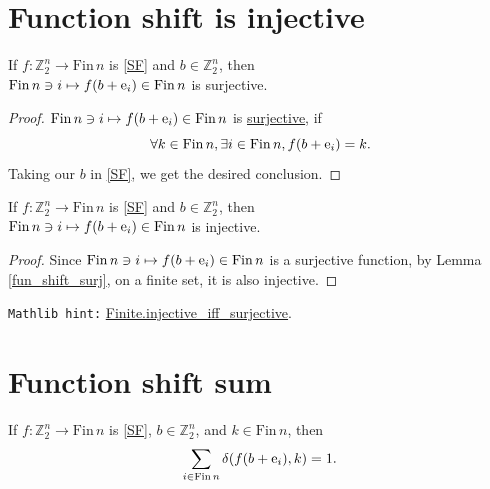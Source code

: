 \documentclass[11pt]{amsart}
\newcommand{\Zz}{\mathbb{Z}_2}
\newcommand{\Fin}{\mathrm{Fin}\,}
\newcommand{\B}{\color{blue}}
\begin{document}
\newpage

\section{Function shift is injective}

\bigskip

\begin{lemma}
\label{fun_shift_surj} If $f:\Zz^n \to \Fin n$ is \eqref{SF} and $b\in\Zz^n$, 
then\\ $\Fin n \ni i \mapsto f(b+{\rm e}_i) \in \Fin n$ is surjective.
\end{lemma}

\begin{proof}
$\Fin n \ni i \mapsto f(b+{\rm e}_i) \in \Fin n$ is \href{https://leanprover-community.github.io/mathlib4_docs/Init/Data/Function.html#Function.Surjective}{surjective}, if
$$\forall k \in \Fin n, \exists i \in \Fin n, f(b+{\rm e}_i) = k.$$
Taking our $b$ in \eqref{SF}, we get the desired conclusion.
\end{proof}

\bigskip

\begin{lemma}
    \label{fun_shift_inj} If $f:\Zz^n \to \Fin n$ is \eqref{SF} and $b\in\Zz^n$, 
    then \\ $\Fin n \ni i \mapsto f(b+{\rm e}_i) \in \Fin n$ is injective.
\end{lemma}

\begin{proof}
Since $\Fin n \ni i \mapsto f(b+{\rm e}_i) \in \Fin n$ is a {\B surjective} function, by Lemma \ref{fun_shift_surj}, on a {\B finite} set, it is also {\B injective}.
\end{proof}

\verb|Mathlib hint:| \href{https://leanprover-community.github.io/mathlib4_docs/Mathlib/Data/Fintype/Card.html#Finite.injective_iff_surjective}{Finite.injective\_iff\_surjective}.

\bigskip


\section{Function shift sum}

\bigskip

\begin{lemma}
\label{fun_shift_sum_one} If $f:\Zz^n \to \Fin n$ is \eqref{SF}, $b\in\Zz^n$, and $k\in\Fin n$, then
$$\sum_{i\in\Fin n} \delta(f(b+{\rm e}_i),k) = 1.$$
\end{lemma}
\end{document}
